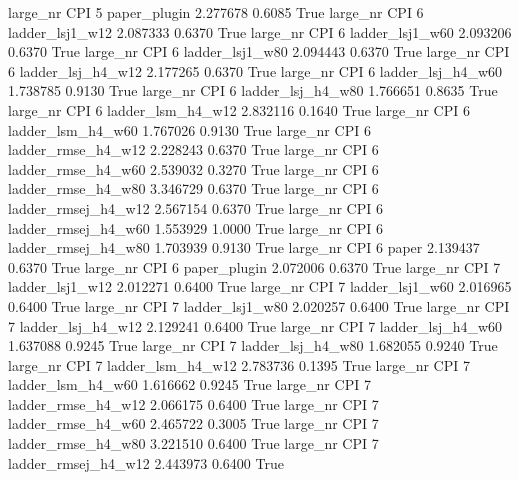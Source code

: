   large_nr      CPI                 5        paper_plugin    2.277678      0.6085    True
  large_nr      CPI                 6     ladder_lsj1_w12    2.087333      0.6370    True
  large_nr      CPI                 6     ladder_lsj1_w60    2.093206      0.6370    True
  large_nr      CPI                 6     ladder_lsj1_w80    2.094443      0.6370    True
  large_nr      CPI                 6   ladder_lsj_h4_w12    2.177265      0.6370    True
  large_nr      CPI                 6   ladder_lsj_h4_w60    1.738785      0.9130    True
  large_nr      CPI                 6   ladder_lsj_h4_w80    1.766651      0.8635    True
  large_nr      CPI                 6   ladder_lsm_h4_w12    2.832116      0.1640    True
  large_nr      CPI                 6   ladder_lsm_h4_w60    1.767026      0.9130    True
  large_nr      CPI                 6  ladder_rmse_h4_w12    2.228243      0.6370    True
  large_nr      CPI                 6  ladder_rmse_h4_w60    2.539032      0.3270    True
  large_nr      CPI                 6  ladder_rmse_h4_w80    3.346729      0.6370    True
  large_nr      CPI                 6 ladder_rmsej_h4_w12    2.567154      0.6370    True
  large_nr      CPI                 6 ladder_rmsej_h4_w60    1.553929      1.0000    True
  large_nr      CPI                 6 ladder_rmsej_h4_w80    1.703939      0.9130    True
  large_nr      CPI                 6               paper    2.139437      0.6370    True
  large_nr      CPI                 6        paper_plugin    2.072006      0.6370    True
  large_nr      CPI                 7     ladder_lsj1_w12    2.012271      0.6400    True
  large_nr      CPI                 7     ladder_lsj1_w60    2.016965      0.6400    True
  large_nr      CPI                 7     ladder_lsj1_w80    2.020257      0.6400    True
  large_nr      CPI                 7   ladder_lsj_h4_w12    2.129241      0.6400    True
  large_nr      CPI                 7   ladder_lsj_h4_w60    1.637088      0.9245    True
  large_nr      CPI                 7   ladder_lsj_h4_w80    1.682055      0.9240    True
  large_nr      CPI                 7   ladder_lsm_h4_w12    2.783736      0.1395    True
  large_nr      CPI                 7   ladder_lsm_h4_w60    1.616662      0.9245    True
  large_nr      CPI                 7  ladder_rmse_h4_w12    2.066175      0.6400    True
  large_nr      CPI                 7  ladder_rmse_h4_w60    2.465722      0.3005    True
  large_nr      CPI                 7  ladder_rmse_h4_w80    3.221510      0.6400    True
  large_nr      CPI                 7 ladder_rmsej_h4_w12    2.443973      0.6400    True
